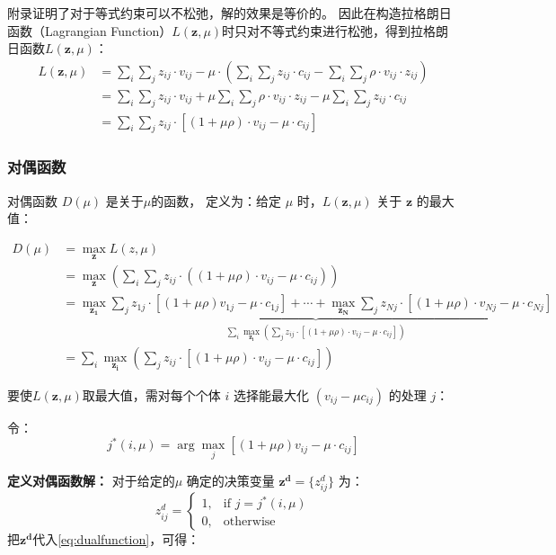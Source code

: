 附录证明了对于等式约束可以不松弛，解的效果是等价的。
因此在构造拉格朗日函数（Lagrangian Function）$L(\bm z,\mu)$时只对不等式约束进行松弛，得到拉格朗日函数$L(\bm{z},\mu)$：
\begin{align}
L(\bm{z}, \mu) &= \sum_{i}\sum_{j} z_{ij} \cdot v_{ij} - \mu \cdot \left( \sum_{i}\sum_{j} z_{ij} \cdot c_{ij}-\sum_i\sum_j\rho \cdot v_{ij}\cdot z_{ij}\right)\\
&= \sum_{i}\sum_{j} z_{ij} \cdot v_{ij} + \mu \sum_i\sum_j\rho \cdot v_{ij}\cdot z_{ij} - \mu \sum_{i}\sum_{j} z_{ij} \cdot c_{ij}  \\
&= \sum_{i}\sum_{j} z_{ij} \cdot [(1+\mu\rho)\cdot v_{ij} - \mu \cdot c_{ij} ]
\end{align}
\subsubsection{对偶函数}
对偶函数 $D(\mu)$ 是关于$\mu$的函数，
定义为：给定 $\mu$ 时，$L(\bm{z}, \mu)$ 关于 $\bm{z}$ 的最大值：

\begin{align}\label{eq:dualfunction}
D(\mu) &= \max_{\bm{z}} L(z, \mu) \\
&= \max_{\bm{z}} \left( \sum_{i}\sum_{j} z_{ij} \cdot ((1+\mu\rho)\cdot v_{ij} - \mu \cdot c_{ij} )    \right)\\
&=  \underbrace{\max_{\bm{z_1}}  \sum_{j} z_{1j} \cdot [(1+\mu\rho)v_{1j} - \mu \cdot c_{1j} ] + \cdots + \max_{\bm{z_N}}  \sum_{j} z_{Nj} \cdot [(1+\mu\rho)\cdot v_{Nj} - \mu \cdot c_{Nj} ]}_{\sum_{i}\max_{\bm{z_{i}}} \left(\sum_{j} z_{ij} \cdot [(1+\mu\rho)\cdot v_{ij} - \mu \cdot c_{ij} ] \right)}\\
&=  \sum_{i}\max_{\bm{z_{i}}} \left(\sum_{j} z_{ij} \cdot \left[(1+\mu\rho)\cdot v_{ij} - \mu \cdot c_{ij} \right] \right) 
\end{align}

要使$L(\bm z,\mu)$取最大值，需对每个个体 $i$ 选择能最大化 $(v_{ij} - \mu c_{ij})$ 的处理 $j$：

令：
\begin{equation}
j^{*}(i, \mu) = \arg\max_{j} [(1+\mu\rho)v_{ij} - \mu \cdot c_{ij}]
\end{equation}

\textbf{定义对偶函数解：}
对于给定的$\mu$ 确定的决策变量  $\bm{z^d} = \{z_{ij}^d\}$ 为：
$$z_{ij}^d = 
\begin{cases} 
1, & \text{if } j = j^*(i,\mu)\\ 
0, & \text{otherwise} 
\end{cases}$$
把$\bm {z^d}$代入\eqref{eq:dualfunction}，可得：

